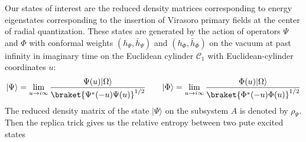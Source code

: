 \documentclass[11pt]{article}
\newcommand{\p}{\partial}
\newcommand{\mO}{\mathcal{O}}
\newcommand{\nn}{\nonumber}
\newcommand{\lb}{\left(}
\newcommand{\rb}{\right)}
\newcommand{\JM}[1]{\textcolor{orange}{#1}}
\begin{document}
  Our states of interest are the reduced density matrices corresponding to
  energy eigenstates corresponding to the insertion of Virasoro primary fields at the center of radial quantization. These states are generated by the action of 
  operators $\Psi$ and $\Phi$ with conformal weights $(h_\Psi, \bar h_\Psi)$ and $(h_\Phi, \bar h_\Phi)$
  on the vacuum at past infinity in imaginary
  time on the Euclidean cylinder $\mathcal{C}_{1}$ with Euclidean-cylinder coordinates $u$:
    \begin{equation}
    |\Psi\rangle = \lim_{u\to i\infty}\frac{\Psi(u)|\Omega\rangle}{\braket{\Psi^*(-u)\Psi(u)}^{1/2}} \qquad |\Phi\rangle = \lim_{u\to i\infty}\frac{\Phi(u)|\Omega\rangle}{\braket{\Phi^*(-u)\Phi(u)}^{1/2}}
  \end{equation}
  The reduced density matrix of the state   
  $|\Psi \rangle$
  on the subsystem $A$
  is denoted by 
  $\rho_\Psi$. Then the replica trick gives us the relative entropy between two pute excited states
\end{document}
